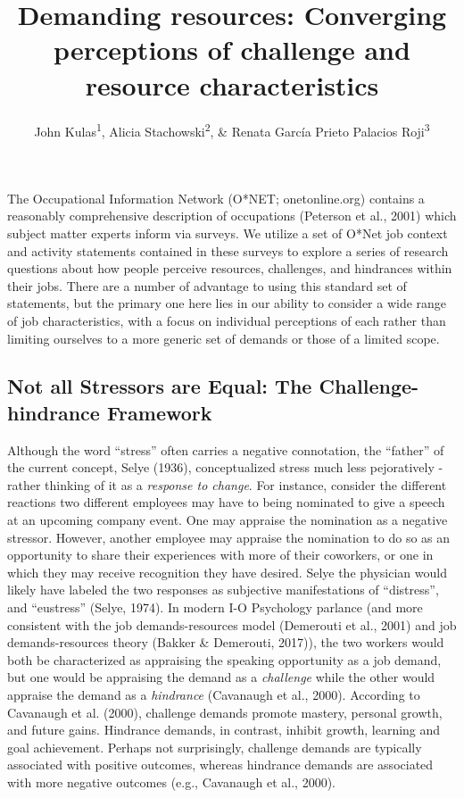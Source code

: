 \documentclass[
  man]{apa6}
\title{Demanding resources: Converging perceptions of challenge and resource characteristics}
\author{John Kulas\textsuperscript{1}, Alicia Stachowski\textsuperscript{2}, \& Renata García Prieto Palacios Roji\textsuperscript{3}}
\date{}
\affiliation{\vspace{0.5cm}\textsuperscript{1} eRg\\\textsuperscript{2} University of Wisconsin - Stout\\\textsuperscript{3} PepsiCo}
\begin{document}
\maketitle

The Occupational Information Network (O*NET; onetonline.org) contains a reasonably comprehensive description of occupations (Peterson et al., 2001) which subject matter experts inform via surveys. We utilize a set of O*Net job context and activity statements contained in these surveys to explore a series of research questions about how people perceive resources, challenges, and hindrances within their jobs. There are a number of advantage to using this standard set of statements, but the primary one here lies in our ability to consider a wide range of job characteristics, with a focus on individual perceptions of each rather than limiting ourselves to a more generic set of demands or those of a limited scope.

\hypertarget{not-all-stressors-are-equal-the-challenge-hindrance-framework}{%
\subsection{Not all Stressors are Equal: The Challenge-hindrance Framework}\label{not-all-stressors-are-equal-the-challenge-hindrance-framework}}

Although the word ``stress'' often carries a negative connotation, the ``father'' of the current concept, Selye (1936), conceptualized stress much less pejoratively - rather thinking of it as a \emph{response to change}. For instance, consider the different reactions two different employees may have to being nominated to give a speech at an upcoming company event. One may appraise the nomination as a negative stressor. However, another employee may appraise the nomination to do so as an opportunity to share their experiences with more of their coworkers, or one in which they may receive recognition they have desired. Selye the physician would likely have labeled the two responses as subjective manifestations of ``distress'', and ``eustress'' (Selye, 1974). In modern I-O Psychology parlance (and more consistent with the job demands-resources model (Demerouti et al., 2001) and job demands-resources theory (Bakker \& Demerouti, 2017)), the two workers would both be characterized as appraising the speaking opportunity as a job demand, but one would be appraising the demand as a \emph{challenge} while the other would appraise the demand as a \emph{hindrance} (Cavanaugh et al., 2000). According to Cavanaugh et al. (2000), challenge demands promote mastery, personal growth, and future gains. Hindrance demands, in contrast, inhibit growth, learning and goal achievement. Perhaps not surprisingly, challenge demands are typically associated with positive outcomes, whereas hindrance demands are associated with more negative outcomes (e.g., Cavanaugh et al., 2000).
\end{document}
